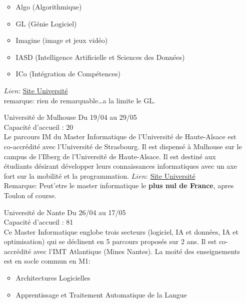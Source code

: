 \documentclass[a4paper,11pt]{article}
\begin{document}
\begin{enumerate}
                \begin{itemize}
                    \item Algo (Algorithmique)
                    \item GL (Génie Logiciel)
                    \item Imagine (image et jeux vidéo)
                    \item IASD (Intelligence Artificielle et Sciences des Données)
                    \item ICo (Intégration de Compétences)
                \end{itemize}
                $Lien$: \href{https://formations.umontpellier.fr/fr/formations/master-lmd-XB/master-informatique-ME154.html}{Site Université}
                \\ remarque: rien de remarquable\ldots a la limite le GL.
\\
        \item [\color{LightOrangeHaf}Université de Mulhouse] Du 19/04 au 29/05
                \\Capacité d'accueil : 20
                \\Le parcours IM du Master Informatique de l’Université de Haute-Alsace est co-accrédité avec l’Université de Strasbourg. Il est dispensé à Mulhouse sur le campus de l’Ilberg de l’Université de Haute-Alsace.  Il est destiné aux étudiants désirant développer leurs connaissances informatiques avec un axe fort sur la mobilité et la programmation.
                $Lien$: \href{https://www.fst.uha.fr/index.php/formations/masters/master-informatique-et-mobilite/}{Site Université}
                \\Remarque: Peut'etre le master informatique le \textbf{plus nul de France}, apres Toulon of course.
\\
        \item [\color{LightOrangeHaf}Université de Nante] Du 26/04 au 17/05
                \\Capacité d'accueil : 81
                \\Ce Master Informatique englobe trois secteurs (logiciel, IA et données, IA et optimisation) qui se déclinent en 5 parcours proposés sur 2 ans. Il est co-accrédité avec l'IMT Atlantique (Mines Nantes). La moité des enseignements est en socle commun en M1:
                \begin{itemize}
                    \item Architectures Logicielles
                    \item Apprentissage et Traitement Automatique de la Langue

\end{itemize}
\end{enumerate}
\end{document}
